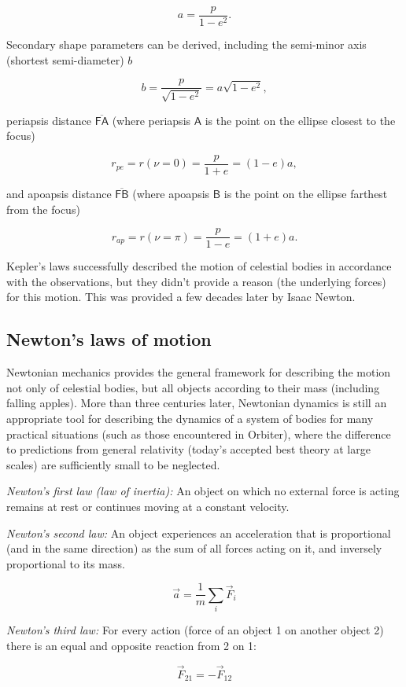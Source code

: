 \documentclass[Orbiter User Manual.tex]{subfiles}
\begin{document}
\[ a = \frac{p}{1 - e^{2}}. \]

Secondary shape parameters can be derived, including the semi-minor axis
(shortest semi-diameter) $b$

\[ b = \frac{p}{\sqrt{1 - e^{2}}} = a \sqrt{1 - e^{2}}, \]

periapsis distance $\overline{\mathsf{FA}}$ (where periapsis $\mathsf{A}$ is the
point on the ellipse closest to the focus)

\[ r_{pe} = r(\nu=0) = \frac{p}{1 + e} = (1 - e) a, \]

and apoapsis distance $\overline{\mathsf{FB}}$ (where apoapsis $\mathsf{B}$ is
the point on the ellipse farthest from the focus)

\[ r_{ap} = r(\nu=\pi) = \frac{p}{1 - e} = (1 + e) a. \]

Kepler's laws successfully described the motion of celestial bodies in
accordance with the observations, but they didn't provide a reason (the
underlying forces) for this motion. This was provided a few decades later by
Isaac Newton.


\subsection{Newton's laws of motion}
Newtonian mechanics provides the general framework for describing the motion not
only of celestial bodies, but all objects according to their mass (including
falling apples). More than three centuries later, Newtonian dynamics is still an
appropriate tool for describing the dynamics of a system of bodies for many
practical situations (such as those encountered in Orbiter), where the
difference to predictions from general relativity (today's accepted best theory
at large scales) are sufficiently small to be neglected.

\emph{Newton's first law (law of inertia):} An object on which no external force
is acting remains at rest or continues moving at a constant velocity.

\emph{Newton's second law:} An object experiences an acceleration that is
proportional (and in the same direction) as the sum of all forces acting on it,
and inversely proportional to its mass.

\[ \vec{a} = \frac{1}{m} \sum_{i} \vec{F}_{i} \]

\emph{Newton's third law:} For every action (force of an object 1 on another
object 2) there is an equal and opposite reaction from 2 on 1:

\[ \vec{F}_{21} = - \vec{F}_{12} \]
\end{document}
